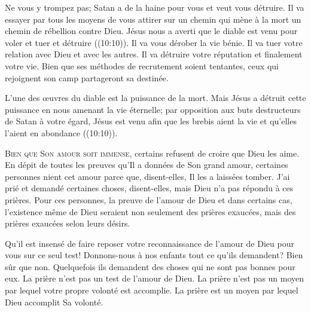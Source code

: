 
Ne vous y trompez pas; Satan a de la haine pour vous et veut vous détruire.
 Il va essayer par tous les moyens de vous attirer sur un chemin
 qui mène à la mort \ocadr un chemin de rébellion contre Dieu.
 Jésus nous a averti que le diable est venu pour
 \og voler et tuer et détruire \fg{} ((10:10)).
 Il va vous dérober la vie bénie. Il va tuer votre relation avec Dieu
 et avec les autres. Il va détruire votre réputation et finalement votre vie.
 Bien que ses méthodes de recrutement soient tentantes,
 ceux qui rejoignent son camp partageront sa destinée. 

L'une des œuvres du diable est la puissance de la mort.
 Mais Jésus a détruit cette puissance en nous amenant la vie éternelle; 
 par opposition aux buts destructeurs de Satan à votre égard,
 Jésus est venu \og afin que les brebis aient la vie
 et qu'elles l'aient en abondance \fg{} ((10:10)). 

\dvrule






\lettrine{B}{ien que Son amour soit immense,}
 certains refusent de croire que Dieu les aime.
 En dépit de toutes les preuves qu'Il a données de Son grand amour,
 certaines personnes nient cet amour parce que, disent-elles,
 Il les a laissées tomber.
 \og J'ai prié et demandé certaines choses, disent-elles, 
 mais Dieu n'a pas répondu à ces prières. \fg{}
 Pour ces personnes, la preuve de l'amour de Dieu
 \ocadr et dans certains cas, l'existence même de Dieu \fcadr{}
 seraient non seulement des prières exaucées,
 mais des prières exaucées selon leurs désirs. 

Qu'il est insensé de faire reposer votre reconnaissance de l'amour de Dieu
 pour vous sur ce seul test!
 Donnons-nous à nos enfants tout ce qu'ils demandent? Bien sûr que non.
 Quelquefois ils demandent des choses qui ne sont pas bonnes pour eux.
 La prière n'est pas un test de l'amour de Dieu.
 La prière n'est pas un moyen par lequel votre propre volonté est accomplie.
 La prière est un moyen par lequel Dieu accomplit Sa volonté. 

